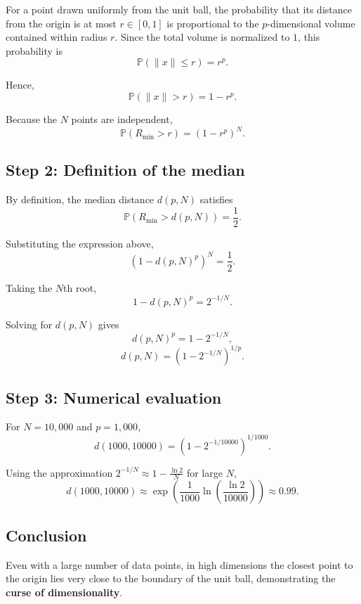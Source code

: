 \documentclass{article}
\begin{document}
For a point drawn uniformly from the unit ball, the probability that its
distance from the origin is at most $r \in [0,1]$ is proportional to the
$p$-dimensional volume contained within radius $r$. Since the total volume
is normalized to $1$, this probability is
\[
\mathbb{P}(\|x\| \le r) = r^p.
\]

Hence,
\[
\mathbb{P}(\|x\| > r) = 1 - r^p.
\]

Because the $N$ points are independent,
\[
\mathbb{P}(R_{\min} > r) = (1 - r^p)^N.
\]

\subsection*{Step 2: Definition of the median}

By definition, the median distance $d(p,N)$ satisfies
\[
\mathbb{P}(R_{\min} > d(p,N)) = \frac{1}{2}.
\]

Substituting the expression above,
\[
(1 - d(p,N)^p)^N = \frac{1}{2}.
\]

Taking the $N$th root,
\[
1 - d(p,N)^p = 2^{-1/N}.
\]

Solving for $d(p,N)$ gives
\[
d(p,N)^p = 1 - 2^{-1/N},
\]
\[
d(p,N) = \left(1 - 2^{-1/N}\right)^{1/p}.
\]

\subsection*{Step 3: Numerical evaluation}

For $N=10{,}000$ and $p=1{,}000$,
\[
d(1000,10000)
=
\left(1 - 2^{-1/10000}\right)^{1/1000}.
\]

Using the approximation $2^{-1/N} \approx 1 - \frac{\ln 2}{N}$ for large $N$,
\[
d(1000,10000)
\approx
\exp\!\left(\frac{1}{1000}
\ln\!\left(\frac{\ln 2}{10000}\right)\right)
\approx 0.99.
\]

\subsection*{Conclusion}

Even with a large number of data points, in high dimensions the closest
point to the origin lies very close to the boundary of the unit ball,
demonstrating the \textbf{curse of dimensionality}.
\end{document}
